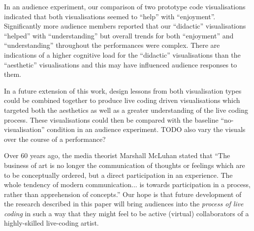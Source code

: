 \documentclass{sig-alternate}
\begin{document}
In an audience experiment, our comparison of two prototype code
visualisations indicated that both visualisations seemed to ``help''
with ``enjoyment''. Significantly more audience members reported that
our ``didactic'' visualisations ``helped'' with ``understanding'' but
overall trends for both ``enjoyment'' and ``understanding'' throughout
the performances were complex. There are indications of a higher
cognitive load for the ``didactic'' visualisations than the
``aesthetic'' visualisations and this may have influenced audience
responses to them.

In a future extension of this work, design lessons from both
visualisation types could be combined together to produce live coding
driven visualisations which targeted both the aesthetics as well as a
greater understanding of the live coding process. These visualisations
could then be compared with the baseline ``no-visualisation''
condition in an audience experiment. TODO also vary the visuals over
the course of a performance?

Over 60 years ago, the media theorist Marshall McLuhan stated that
``The business of art is no longer the communication of thoughts or
feelings which are to be conceptually ordered, but a direct
participation in an experience. The whole tendency of modern
communication... is towards participation in a process, rather than
apprehension of concepts.'' \cite{McLuhan} Our hope is that future
development of the research described in this paper will bring
audiences into the \emph{process of live coding} in such a way that
they might feel to be active (virtual) collaborators of a
highly-skilled live-coding artist.


\end{document}
